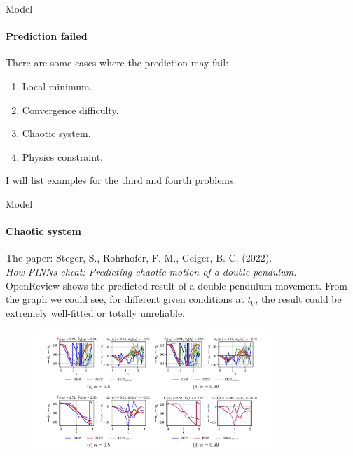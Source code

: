     \begin{frame}{Model}
    \framesubtitle{Prediction failed}
        There are some cases where the prediction may fail:
        \begin{enumerate}
        \item Local minimum.
        \item Convergence difficulty.
        \item Chaotic system.
        \item Physics constraint.   
        \end{enumerate}
        I will list examples for the third and fourth problems.
    \end{frame}
    
    \begin{frame}{Model}
    \framesubtitle{Chaotic system}
        The paper: Steger, S., Rohrhofer, F. M., Geiger, B. C. (2022).\\
        \textit{How PINNs cheat: Predicting chaotic motion of a double pendulum.}\\
        OpenReview shows the predicted result of a double pendulum movement.
        From the graph we could see, for different given conditions at \( t_0 \), the result could be extremely well-fitted or totally unreliable.
        \begin{figure}[H]
            \centering
            \includegraphics[width=0.8\textwidth]{img/Screenshot 2024-06-02 at 4.02.10 PM}
        \end{figure} 
    \end{frame}
    
